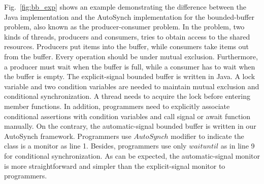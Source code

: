 \documentclass[preprint]{sigplanconf}
\begin{document}
Fig.~\ref{fig:bb_exp} shows an example demonstrating the difference between 
the Java implementation and the AutoSynch implementation for the 
bounded-buffer problem, also known as the producer-consumer problem. 
In the problem, two kinds of threads, producers and consumers, tries to obtain 
access to the shared resources. Producers put items 
into the buffer, while consumers take items out from the buffer. Every 
operation should be under mutual exclusion. Furthermore, a producer must wait  
when the buffer is full, while a consumer has to wait when the 
buffer is empty. The explicit-signal bounded buffer is written in Java. A 
lock variable and two condition variables are needed to maintain mutual exclusion 
and conditional synchronization. A thread needs to acquire the lock before entering member
functions. In addition, programmers need to explicitly associate conditional 
assertions with condition variables and call signal or await function manually.
On the contrary, 
the automatic-signal bounded buffer is written in our AutoSynch framework.
Programmers use $AutoSynch$ modifier to indicate the class is a monitor as line 
1. Besides, programmers use only $waituntil$ as in line 9 for conditional
synchronization. As can be expected, the automatic-signal monitor is
more straightforward and simpler than the explicit-signal monitor to
programmers. 
\end{document}
